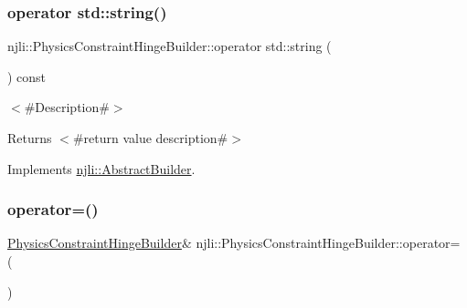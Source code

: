 \subsubsection{\texorpdfstring{operator std\+::string()}{operator std::string()}}
{\footnotesize\ttfamily njli\+::\+Physics\+Constraint\+Hinge\+Builder\+::operator std\+::string (\begin{DoxyParamCaption}{ }\end{DoxyParamCaption}) const\hspace{0.3cm}{\ttfamily [virtual]}}

$<$\#\+Description\#$>$

\begin{DoxyReturn}{Returns}
$<$\#return value description\#$>$ 
\end{DoxyReturn}


Implements \mbox{\hyperlink{classnjli_1_1_abstract_builder_a3e6e553e06d1ca30517ad5fb0bd4d000}{njli\+::\+Abstract\+Builder}}.

\mbox{\label{classnjli_1_1_physics_constraint_hinge_builder_a9ceff764c6378af8a9a6284c35a0c507}} 
\subsubsection{\texorpdfstring{operator=()}{operator=()}}
{\footnotesize\ttfamily \mbox{\hyperlink{classnjli_1_1_physics_constraint_hinge_builder}{Physics\+Constraint\+Hinge\+Builder}}\& njli\+::\+Physics\+Constraint\+Hinge\+Builder\+::operator= (\begin{DoxyParamCaption}\item[{const \mbox{\hyperlink{classnjli_1_1_physics_constraint_hinge_builder}{Physics\+Constraint\+Hinge\+Builder}} \&}]{ }\end{DoxyParamCaption})\hspace{0.3cm}{\ttfamily [protected]}}

\mbox{\label{classnjli_1_1_physics_constraint_hinge_builder_add1abc1990445ad5c38757dbf5b6f131}} 
